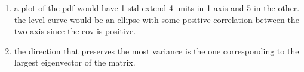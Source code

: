 \documentclass{article}
\begin{document}
\begin{enumerate}
\begin{enumerate}
        \begin{equation}
            \begin{split}
            \begin{pmatrix}
                25 & 15\\
                15&16
            \end{pmatrix}
            \begin{pmatrix}
                \frac{1}{10}(3\pm\sqrt{109})\\
                1
            \end{pmatrix} &= \begin{pmatrix}
                15+\frac{5}{2}(3\pm\sqrt{109})\\
                16+\frac{3}{2}(3\pm\sqrt{109})\\
            \end{pmatrix}\\
            &=\frac{1}{2}(41+3\sqrt{109})\begin{pmatrix}
                \frac{1}{10}(3\pm\sqrt{109})\\
                1
            \end{pmatrix}
            \end{split}
        \end{equation}

        \item a plot of the pdf would have 1 std extend 4 units in 1 axis and 5 in the other. the level curve would be an ellipse with some positive correlation between the two axis since the cov is positive. 
        \item the direction that preserves the most variance is the one corresponding to the largest eigenvector of the matrix. 
        

\end{enumerate}
\end{enumerate}
\end{document}
